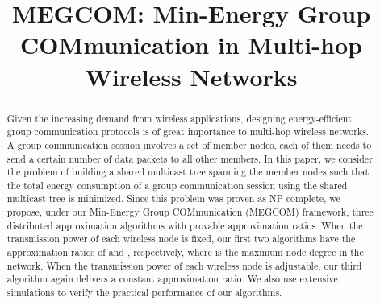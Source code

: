 \documentclass[10pt, conference, compsocconf]{IEEEtran}
\begin{document}
\title{MEGCOM: Min-Energy Group COMmunication in Multi-hop Wireless Networks}

\author{
}

\maketitle

\begin{abstract}
Given the increasing demand from wireless applications, designing energy-efficient group communication protocols is of great importance to multi-hop wireless networks. A group communication session involves a set of member nodes, each of them needs to send a certain number of data packets to all other members. In this paper, we consider the problem of building a shared multicast tree spanning the member nodes such that the total energy consumption of a group communication session using the shared multicast tree is minimized. Since this problem was proven as NP-complete, we propose, under our Min-Energy Group COMmunication (MEGCOM) framework, three distributed approximation algorithms with provable approximation ratios. When the transmission power of each wireless node is fixed, our first two algorithms have the approximation ratios of  and , respectively, where  is the maximum node degree in the network. When the transmission power of each wireless node is adjustable, our third algorithm again delivers a constant approximation ratio. We also use extensive simulations to verify the practical performance of our algorithms.
\end{abstract}

\IEEEpeerreviewmaketitle
\end{document}

